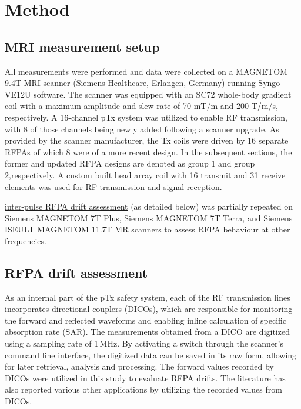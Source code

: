 
\section{Method}\label{sec2}

\subsection{MRI measurement setup}
All measurements were performed and data were collected on a MAGNETOM 9.4T MRI scanner (Siemens Healthcare, Erlangen, Germany) running Syngo VE12U software. The scanner was equipped with an SC72 whole-body gradient coil with a maximum amplitude and slew rate of 70 mT/m and 200 T/m/s, respectively. A 16-channel pTx system was utilized to enable RF transmission, with 8 of those channels being newly added following a scanner upgrade. As provided by the scanner manufacturer, the Tx coils were driven by 16 separate RFPAs of which 8 were of a more recent design. In the subsequent sections, the former and updated RFPA designs are denoted as group 1 and group 2,respectively. A custom built head array coil with 16 transmit and 31 receive elements was used for RF transmission and signal reception.\cite{shajan201416} 

\hyperlink{subsubsection.2.2.1}{inter-pulse RFPA drift assessment} (as detailed below) was partially repeated on Siemens MAGNETOM 7T Plus, Siemens MAGNETOM 7T Terra, and Siemens ISEULT MAGNETOM 11.7T MR scanners to assess RFPA behaviour at other frequencies. 

\subsection{RFPA drift assessment}
As an internal part of the pTx safety system, each of the RF transmission lines incorporates directional couplers (DICOs), which are responsible for monitoring the forward and reflected waveforms and enabling inline calculation of specific absorption rate (SAR). The measurements obtained from a DICO are digitized using a sampling rate of 1\,MHz. By activating a switch through the scanner's command line interface, the digitized data can be saved in its raw form, allowing for later retrieval, analysis and processing. The forward values recorded by DICOs were utilized in this study to evaluate RFPA drifts. The literature has also reported various other applications by utilizing the recorded values from DICOs.\cite{Jaeschke2019,Williams2021,Hess2017}

